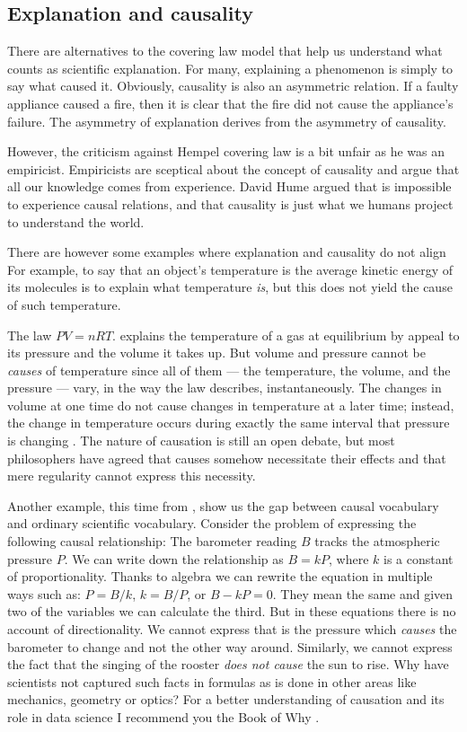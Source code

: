 \documentclass[
  12pt,
]{book}
\begin{document}
\subsection{Explanation and causality}\label{explanation-and-causality}

There are alternatives to the covering law model that help us understand what counts as scientific explanation. For many, explaining a phenomenon is simply to say what caused it. Obviously, causality is also an asymmetric relation. If a faulty appliance caused a fire, then it is clear that the fire did not cause the appliance's failure. The asymmetry of explanation derives from the asymmetry of causality.

However, the criticism against Hempel covering law is a bit unfair as he was an empiricist. Empiricists are sceptical about the concept of causality and argue that all our knowledge comes from experience. David Hume argued that is impossible to experience causal relations, and that causality is just what we humans project to understand the world.

There are however some examples where explanation and causality do not align For example, to say that an object's temperature is the average kinetic energy of its molecules is to explain what temperature \emph{is}, but this does not yield the cause of such temperature.

The law \(PV = nRT.\) explains the temperature of a gas at equilibrium by appeal to its pressure and the volume it takes up. But volume and pressure cannot be \emph{causes} of temperature since all of them --- the temperature, the volume, and the pressure --- vary, in the way the law describes, instantaneously. The changes in volume at one time do not cause changes in temperature at a later time; instead, the change in temperature occurs during exactly the same interval that pressure is changing \citep{rosenberg2019philosophy}. The nature of causation is still an open debate, but most philosophers have agreed that causes somehow necessitate their effects and that mere regularity cannot express this necessity.

Another example, this time from \citep{book-of-why}, show us the gap between causal vocabulary and ordinary scientific vocabulary. Consider the problem of expressing the following causal relationship: The barometer reading \(B\) tracks the atmospheric pressure \(P\). We can write down the relationship as \(B = kP\), where \(k\) is a constant of proportionality. Thanks to algebra we can rewrite the equation in multiple ways such as: \(P = B/k\), \(k = B/P\), or \(B-kP = 0\). They mean the same and given two of the variables we can calculate the third. But in these equations there is no account of directionality. We cannot express that is the pressure which \emph{causes} the barometer to change and not the other way around. Similarly, we cannot express the fact that the singing of the rooster \emph{does not cause} the sun to rise. Why have scientists not captured such facts in formulas as is done in other areas like mechanics, geometry or optics? For a better understanding of causation and its role in data science I recommend you the Book of Why \citep{book-of-why}.
\end{document}
